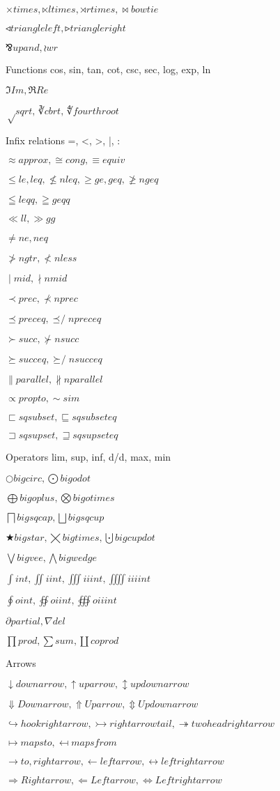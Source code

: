 \documentclass{article}
\begin{document}
$× times, ⋉ ltimes, ⋊ rtimes, ⋈ bowtie$

$◃ triangleleft, ▹ triangleright$

$⅋ upand, ≀ wr$

Functions cos, sin, tan, cot, csc, sec, log, exp, ln

$ℑ Im, ℜ Re$

$√ sqrt, ∛ cbrt, ∜ fourthroot$

Infix relations =, <, >, |, :

$≈ approx, ≅ cong, ≡ equiv$

$≤ le, leq, ≰ nleq, ≥ ge, geq, ≱ ngeq$

$≦ leqq, ≧ geqq$

$≪ ll, ≫ gg$

$≠ ne, neq$

$≯ ngtr, ≮ nless$

$∣ mid, ∤ nmid$

$≺ prec, ⊀ nprec$

$⪯ preceq, ⪯̸ npreceq$

$≻ succ, ⊁ nsucc$

$⪰ succeq, ⪰̸ nsucceq$

$∥ parallel, ∦ nparallel$

$∝ propto, ∼ sim$

$⊏ sqsubset, ⊑ sqsubseteq$

$⊐ sqsupset, ⊒ sqsupseteq$

Operators lim, sup, inf, d/d, max, min

$○ bigcirc, ⨀ bigodot$

$⨁ bigoplus, ⨂ bigotimes$

$⨅ bigsqcap, ⨆ bigsqcup$

$★ bigstar, ⨉ bigtimes, ⨃ bigcupdot$

$⋁ bigvee, ⋀ bigwedge$

$∫ int, ∬ iint, ∭ iiint, ⨌ iiiint$

$∮ oint, ∯ oiint, ∰ oiiint$

$∂ partial, ∇ del$

$∏ prod, ∑ sum, ∐ coprod$

Arrows 

$↓ downarrow, ↑ uparrow, ↕ updownarrow$

$⇓ Downarrow, ⇑ Uparrow, ⇕ Updownarrow$

$↪ hookrightarrow, ↣ rightarrowtail, ↠ twoheadrightarrow$

$↦ mapsto, ↤ mapsfrom$

$→ to, rightarrow, ← leftarrow, ↔ leftrightarrow$

$⇒ Rightarrow, ⇐ Leftarrow, ⇔ Leftrightarrow$
\end{document}
